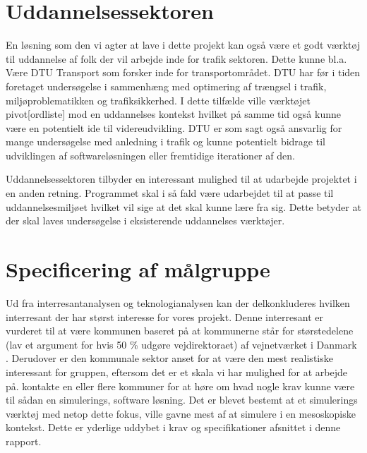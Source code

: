 \section{Uddannelsessektoren}
En løsning som den vi agter at lave i dette projekt kan også være et godt værktøj til uddannelse af folk der vil arbejde inde for trafik sektoren. Dette kunne bl.a. Være DTU Transport som forsker inde for transportområdet. DTU har før i tiden foretaget undersøgelse i sammenhæng med optimering af trængsel i trafik, miljøproblematikken og trafiksikkerhed\cite{DtuForskning}. I dette tilfælde ville værktøjet pivot[ordliste] mod en uddannelses kontekst hvilket på samme tid også kunne være en potentielt ide til videreudvikling. DTU er som sagt også ansvarlig for mange undersøgelse med anledning i trafik og kunne potentielt bidrage til udviklingen af softwareløsningen eller fremtidige iterationer af den.

\vspace{5mm}

Uddannelsessektoren tilbyder en interessant mulighed til at udarbejde projektet i en anden retning. Programmet skal i så fald være udarbejdet til at passe til uddannelsesmiljøet hvilket vil sige at det skal kunne lære fra sig. Dette betyder at der skal laves undersøgelse i eksisterende uddannelses værktøjer.

\section{Specificering af målgruppe}

Ud fra interresantanalysen og teknologianalysen kan der delkonkluderes hvilken interresant der har størst interesse for vores projekt. Denne interresant er vurderet til at være kommunen baseret på at kommunerne står for størstedelene (lav et argument for hvis 50 \% udgøre vejdirektoraet) af vejnetværket i Danmark \cite{benjasfar}. Derudover er den kommunale sektor anset for at være den mest realistiske interessant for gruppen, eftersom det er et skala vi har mulighed for at arbejde på. kontakte en eller flere kommuner for at høre om hvad nogle krav kunne være til sådan en simulerings, software løsning. Det er blevet bestemt at et simulerings værktøj med netop dette fokus, ville gavne mest af at simulere i en mesoskopiske kontekst. Dette er yderlige uddybet i krav og specifikationer afsnittet i denne rapport.
